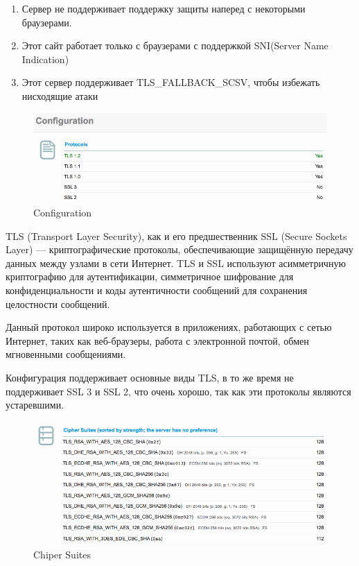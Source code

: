 \documentclass[utf8x, 12pt]{G7-32}
\begin{document}
\begin{enumerate}
		\item Сервер не поддерживает поддержку защиты наперед с некоторыми браузерами.
		\item Этот сайт работает только с браузерами с поддержкой SNI(Server Name Indication)
		\item Этот сервер поддерживает TLS\_FALLBACK\_SCSV, чтобы избежать нисходящие атаки
\end{enumerate}


\begin{figure}[hhh!]
	\begin{center}
		\includegraphics[width=14cm]{img/best2}
	\end{center}
	\vspace{-5mm}\caption{Configuration}
\end{figure}

TLS (Transport Layer Security), как и его предшественник SSL (Secure Sockets Layer) --- криптографические протоколы, обеспечивающие защищённую передачу данных между узлами в сети Интернет. TLS и SSL используют асимметричную криптографию для аутентификации, симметричное шифрование для конфиденциальности и коды аутентичности сообщений для сохранения целостности сообщений.

Данный протокол широко используется в приложениях, работающих с сетью Интернет, таких как веб-браузеры, работа с электронной почтой, обмен мгновенными сообщениями.

Конфигурация поддерживает основные виды TLS, в то же время не поддерживает SSL 3 и SSL 2, что очень хорошо, так как эти протоколы являются устаревшими.


\begin{figure}[hhh!]
	\begin{center}
		\includegraphics[width=14cm]{img/best3}
	\end{center}
	\vspace{-5mm}\caption{Chiper Suites}
\end{figure}
\end{document}
